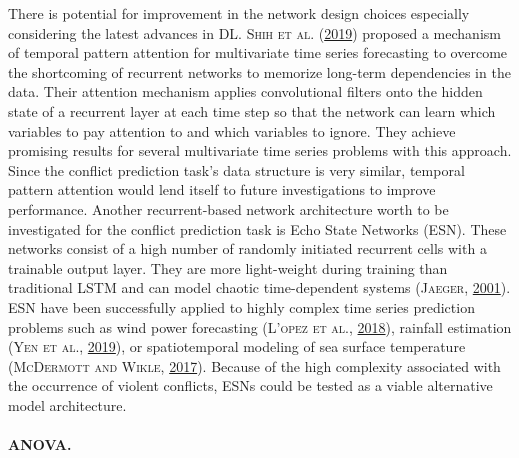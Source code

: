 \documentclass[a4paper,11pt]{article}
\begin{document}
There is potential for improvement in the network design choices especially
considering the latest advances in DL. \textsc{\textnormal{Shih} \textnormal{et al.}} \textsc{(\textnormal{\protect\hyperlink{ref-shih2019}{2019}})} proposed a mechanism of temporal
pattern attention for multivariate time series forecasting to overcome the shortcoming
of recurrent networks to memorize long-term dependencies in the data. Their attention
mechanism applies convolutional filters onto the hidden state of a recurrent layer
at each time step so that the network can learn which variables to pay attention
to and which variables to ignore. They achieve promising results for several
multivariate time series problems with this approach. Since the conflict prediction
task's data structure is very similar, temporal pattern attention would lend
itself to future investigations to improve performance. Another recurrent-based
network architecture worth to be investigated for the conflict prediction task
is Echo State Networks (ESN). These networks consist of a high number of randomly
initiated recurrent cells with a trainable output layer. They are more light-weight
during training than traditional LSTM and can model chaotic time-dependent systems \textsc{(\textnormal{\textsc{Jaeger}}, \textnormal{\protect\hyperlink{ref-jaeger2001}{2001}})}. ESN
have been successfully applied to highly complex time series prediction problems
such as wind power forecasting \textsc{(\textnormal{\textsc{L\a'opez} \textsc{et al.}}, \textnormal{\protect\hyperlink{ref-lopez2018}{2018}})}, rainfall estimation \textsc{(\textnormal{\textsc{Yen} \textsc{et al.}}, \textnormal{\protect\hyperlink{ref-yen2019}{2019}})}, or
spatiotemporal modeling of sea surface temperature \textsc{(\textnormal{\textsc{McDermott} and \textsc{Wikle}}, \textnormal{\protect\hyperlink{ref-mcdermott2017}{2017}})}. Because of
the high complexity associated with the occurrence of violent conflicts, ESNs
could be tested as a viable alternative model architecture.

\hypertarget{anova.}{%
\paragraph{ANOVA.}\label{anova.}}
\end{document}
